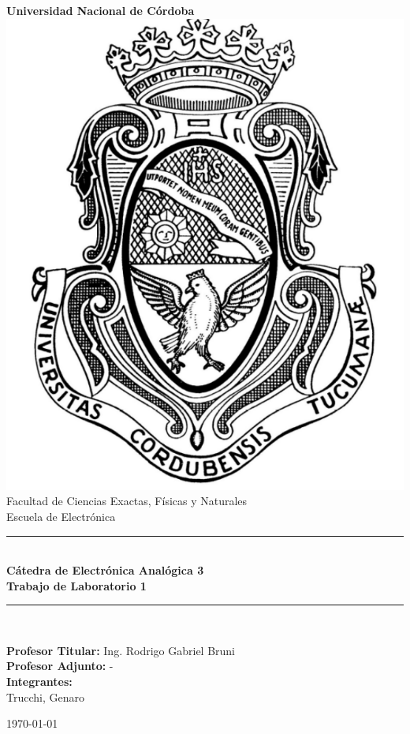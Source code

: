 \begin{titlepage}
    \begin{center}
        {\LARGE \textbf{Universidad Nacional de Córdoba}}\\[1.5cm]

        \includegraphics[scale=0.4]{img/logo2.png}\\[1.5cm]

        {\large Facultad de Ciencias Exactas, Físicas y Naturales}\\
        {\large Escuela de Electrónica}\\[1cm]

        \rule{\linewidth}{0.5mm}\\[0.4cm]
        {\Large \textbf{Cátedra de Electrónica Analógica 3}}\\[0.3cm]
        {\LARGE \textbf{Trabajo de Laboratorio 1}}\\[0.3cm]
        \rule{\linewidth}{0.5mm}\\[1cm]

        \begin{flushleft}
        {\large 
            \textbf{Profesor Titular:} Ing. Rodrigo Gabriel Bruni\\
            \textbf{Profesor Adjunto:} -\\[0.5cm]
            \textbf{Integrantes:}\\
            Trucchi, Genaro\\
        }
        \end{flushleft}

        \vfill

        {\large \today}
    \end{center}
\end{titlepage}
